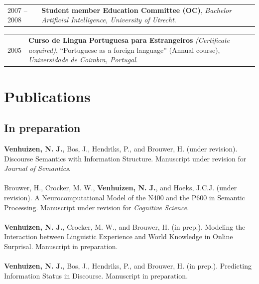 \documentclass[a4paper,10pt]{article}
\def\leftcolwidth{.12\textwidth}
\def\tablevspace{10pt}
\begin{document}
\vspace{\tablevspace}

\noindent
\begin{tabularx}{\textwidth}{ p{\leftcolwidth} X }
  2007 -- 2008
  & \textbf{Student member Education Committee (OC)},
    \textit{Bachelor Artificial Intelligence, University of Utrecht}.\\
\end{tabularx}

\vspace{\tablevspace}

\noindent
\begin{tabularx}{\textwidth}{ p{\leftcolwidth} X }
  2005 & \textbf{Curso de Lingua Portuguesa para Estrangeiros} 
         \textit{(Certificate acquired)}, ``Portuguese as a foreign language''
         (Annual course), \textit{Universidade de Coimbra, Portugal}.
\end{tabularx}




\section*{Publications}

\subsection*{In preparation}

\noindent
    \textbf{Venhuizen, N. J.}, Bos, J., Hendriks, P., and Brouwer, H.
    (under revision). Discourse Semantics with Information Structure.
    Manuscript under revision for \textit{Journal of Semantics}.\\
    \\
    Brouwer, H., Crocker, M. W., \textbf{Venhuizen, N. J.}, and Hoeks, J.C.J.
    (under revision). A Neurocomputational Model of the N400 and the P600 in
    Semantic Processing. Manuscript under revision for \textit{Cognitive Science}.\\
    \\
    \textbf{Venhuizen, N. J.}, Crocker, M. W., and Brouwer, H. 
    (in prep.). Modeling the Interaction between Linguistic Experience and
    World Knowledge in Online Surprisal. Manuscript in preparation.\\
    \\
    \textbf{Venhuizen, N. J.}, Bos, J., Hendriks, P., and Brouwer, H. 
    (in prep.). Predicting Information Status in Discourse. Manuscript in
    preparation.
\end{document}
